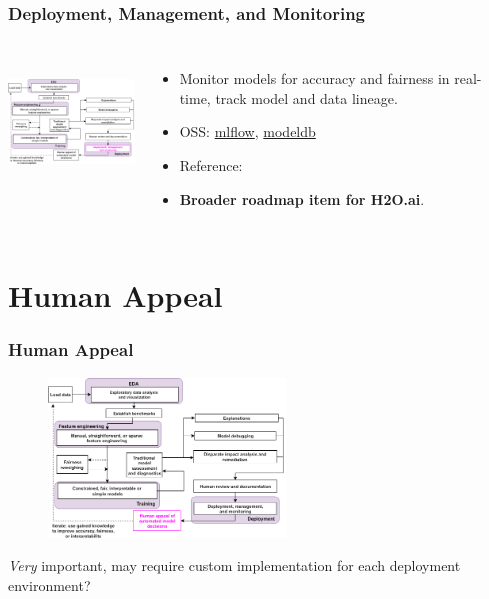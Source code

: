 \documentclass[11pt,
               aspectratio=169,
               hyperref={colorlinks}
               ]{beamer}
\begin{document}
		\begin{frame}

			\frametitle{Deployment, Management, and Monitoring}		
			
			\begin{columns}
	
				\centering
				\includegraphics[height=100pt]{img/deploy.png}
				
				\vspace{-5pt}
				\begin{itemize}
					\item Monitor models for accuracy and fairness in real-time, track model and data lineage.
					\item OSS: \href{https://github.com/mlflow/mlflow}{mlflow}, \href{https://github.com/mitdbg/modeldb}{modeldb}
					\item Reference: 
					\item \textbf{Broader roadmap item for H2O.ai}.
				\end{itemize}
				
			\end{columns}
		
		\end{frame}

	\section{Human Appeal}

		\begin{frame}	
			\frametitle{Human Appeal}		
			
			\begin{figure}[htb]
				\begin{center}
					\includegraphics[height=120pt]{img/ha.png}
					\label{fig:blueprint}
				\end{center}
			\end{figure}	

			\centering
			\vspace{-10pt}
			\textit{Very} important, may require custom implementation for each deployment environment?

		\end{frame}
\end{document}
